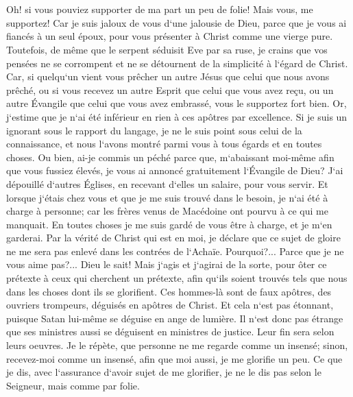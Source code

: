 \chapter{}

\verse Oh! si vous pouviez supporter de ma part un peu de folie! Mais vous, me supportez! 
\verse Car je suis jaloux de vous d`une jalousie de Dieu, parce que je vous ai fiancés à un seul époux, pour vous présenter à Christ comme une vierge pure. 
\verse Toutefois, de même que le serpent séduisit Eve par sa ruse, je crains que vos pensées ne se corrompent et ne se détournent de la simplicité à l`égard de Christ. 
\verse Car, si quelqu`un vient vous prêcher un autre Jésus que celui que nous avons prêché, ou si vous recevez un autre Esprit que celui que vous avez reçu, ou un autre Évangile que celui que vous avez embrassé, vous le supportez fort bien. 
\verse Or, j`estime que je n`ai été inférieur en rien à ces apôtres par excellence. 
\verse Si je suis un ignorant sous le rapport du langage, je ne le suis point sous celui de la connaissance, et nous l`avons montré parmi vous à tous égards et en toutes choses. 
\verse Ou bien, ai-je commis un péché parce que, m`abaissant moi-même afin que vous fussiez élevés, je vous ai annoncé gratuitement l`Évangile de Dieu? 
\verse J`ai dépouillé d`autres Églises, en recevant d`elles un salaire, pour vous servir. Et lorsque j`étais chez vous et que je me suis trouvé dans le besoin, je n`ai été à charge à personne; 
\verse car les frères venus de Macédoine ont pourvu à ce qui me manquait. En toutes choses je me suis gardé de vous être à charge, et je m`en garderai. 
\verse Par la vérité de Christ qui est en moi, je déclare que ce sujet de gloire ne me sera pas enlevé dans les contrées de l`Achaïe. 
\verse Pourquoi?... Parce que je ne vous aime pas?... Dieu le sait! 
\verse Mais j`agis et j`agirai de la sorte, pour ôter ce prétexte à ceux qui cherchent un prétexte, afin qu`ils soient trouvés tels que nous dans les choses dont ils se glorifient. 
\verse Ces hommes-là sont de faux apôtres, des ouvriers trompeurs, déguisés en apôtres de Christ. 
\verse Et cela n`est pas étonnant, puisque Satan lui-même se déguise en ange de lumière. 
\verse Il n`est donc pas étrange que ses ministres aussi se déguisent en ministres de justice. Leur fin sera selon leurs oeuvres. 
\verse Je le répète, que personne ne me regarde comme un insensé; sinon, recevez-moi comme un insensé, afin que moi aussi, je me glorifie un peu. 
\verse Ce que je dis, avec l`assurance d`avoir sujet de me glorifier, je ne le dis pas selon le Seigneur, mais comme par folie. 
